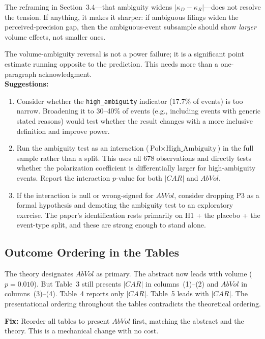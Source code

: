 \documentclass[11pt]{article}
\begin{document}
The reframing in Section~3.4---that ambiguity widens $|\kappa_D - \kappa_R|$---does not resolve the tension. If anything, it makes it sharper: if ambiguous filings widen the perceived-precision gap, then the ambiguous-event subsample should show \emph{larger} volume effects, not smaller ones.

\begin{criticalbox}
The volume-ambiguity reversal is not a power failure; it is a significant point estimate running opposite to the prediction. This needs more than a one-paragraph acknowledgment.\\[4pt]
\textbf{Suggestions:}
\begin{enumerate}[leftmargin=*]
    \item Consider whether the \texttt{high\_ambiguity} indicator (17.7\% of events) is too narrow. Broadening it to 30--40\% of events (e.g., including events with generic stated reasons) would test whether the result changes with a more inclusive definition and improve power.
    \item Run the ambiguity test as an interaction ($\text{Pol} \times \text{High\_Ambiguity}$) in the full sample rather than a split. This uses all 678 observations and directly tests whether the polarization coefficient is differentially larger for high-ambiguity events. Report the interaction $p$-value for both $|CAR|$ and $AbVol$.
    \item If the interaction is null or wrong-signed for $AbVol$, consider dropping P3 as a formal hypothesis and demoting the ambiguity test to an exploratory exercise. The paper's identification rests primarily on H1 + the placebo + the event-type split, and these are strong enough to stand alone.
\end{enumerate}
\end{criticalbox}

\subsection{Outcome Ordering in the Tables}

The theory designates $AbVol$ as primary. The abstract now leads with volume ($p = 0.010$). But Table~3 still presents $|CAR|$ in columns~(1)--(2) and $AbVol$ in columns~(3)--(4). Table~4 reports only $|CAR|$. Table~5 leads with $|CAR|$. The presentational ordering throughout the tables contradicts the theoretical ordering.

\begin{majorbox}
\textbf{Fix:} Reorder all tables to present $AbVol$ first, matching the abstract and the theory. This is a mechanical change with no cost.
\end{majorbox}
\end{document}
